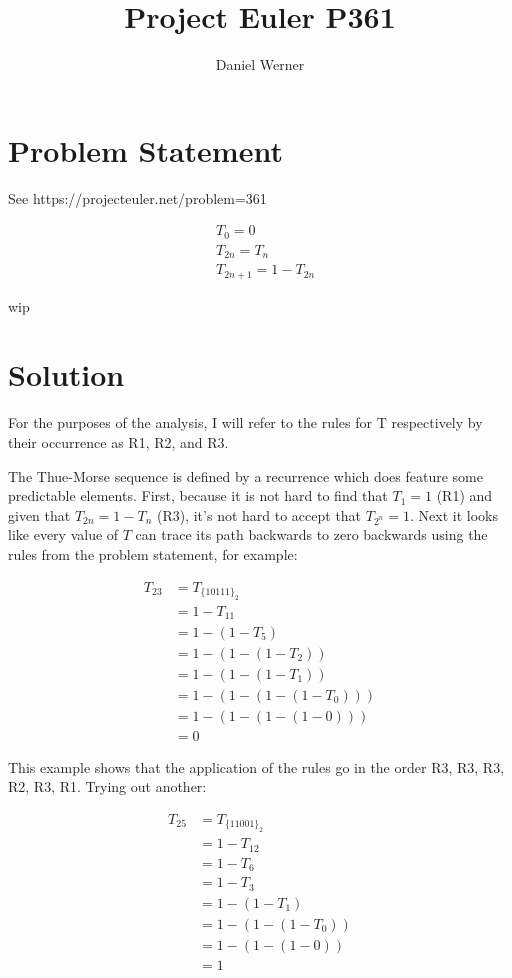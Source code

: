 \documentclass{article}
\title{Project Euler P361}
\author{Daniel Werner}
\begin{document}
\maketitle

\section*{Problem Statement}

See https://projecteuler.net/problem=361

\begin{align*}
    &T_0 = 0 \\
    &T_{2n} = T_n \\
    &T_{2n + 1} = 1 - T_{2n}
\end{align*}

wip

\section*{Solution}

For the purposes of the analysis, I will refer to the rules for T respectively by their occurrence as R1, R2, and R3.

\par

The Thue-Morse sequence is defined by a recurrence which does feature some predictable elements.  First, because it is not hard to find that $T_1 = 1$ (R1) and given that $T_{2n} = 1 - T_n$ (R3), it's not hard to accept that $T_{2^n} = 1$.  Next it looks like every value of $T$ can trace its path backwards to zero backwards using the rules from the problem statement, for example:

\begin{align*}
    T_{23} &= T_{\{10111\}_2} \\
    &= 1 - T_{11} \\ 
    &= 1 - (1 - T_5) \\
    &= 1 - (1 - (1 - T_2)) \\
    &= 1 - (1 - (1 - T_1)) \\
    &= 1 - (1 - (1 - (1 - T_0))) \\
    &= 1 - (1 - (1 - (1 - 0))) \\
    &= 0
\end{align*}

This example shows that the application of the rules go in the order R3, R3, R3, R2, R3, R1. Trying out another:

\begin{align*}
    T_{25} &= T_{\{11001\}_2} \\
    &= 1 - T_{12} \\ 
    &= 1 - T_6 \\
    &= 1 - T_3 \\
    &= 1 - (1 - T_1) \\
    &= 1 - (1 - (1 - T_0)) \\
    &= 1 - (1 - (1 - 0)) \\
    &= 1
\end{align*}
\end{document}
